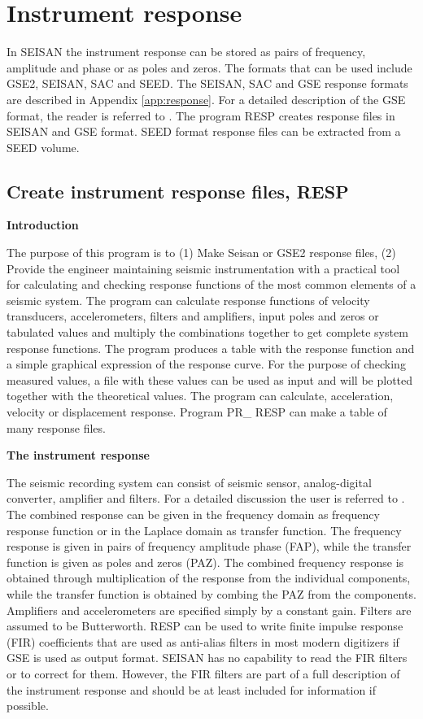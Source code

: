 
\section{Instrument response} 
\label{sect:inst-resp}

In SEISAN the instrument response can be stored as pairs of frequency, 
amplitude and phase or as poles and zeros. The formats that can be 
used include GSE2, SEISAN, SAC and SEED. The SEISAN, SAC and GSE response formats 
are described in Appendix \ref{app:response}. For a detailed description of the GSE 
format, the reader is referred to \citet{gsett1997}. The program RESP 
creates response files in SEISAN and GSE format. SEED format response 
files can be extracted from a SEED volume.  

\subsection{Create instrument response files, RESP} 

\textbf{Introduction}

The purpose of this program is to (1) Make Seisan or GSE2 response files, (2) Provide the engineer maintaining seismic instrumentation with a practical tool for calculating and checking response functions of the most common elements of a seismic system. The program can calculate response functions of velocity transducers, accelerometers, filters and amplifiers, input poles and zeros or tabulated values and multiply the combinations together to get complete system response functions. The program produces a table with the response function and a simple graphical expression of the response curve. For the purpose of checking measured values, a file with these values can be used as input and will be plotted together with the theoretical values. The program can calculate, acceleration, velocity or displacement response. Program PR\_ RESP  can make a table of many response files. 

\textbf{The instrument response}

The seismic recording system can consist of seismic sensor, analog-digital converter, amplifier and filters. For a detailed discussion the user is referred to \citet{scherbaum1996}. The combined response can be given in the frequency domain as frequency response function or in the Laplace domain as transfer function. The frequency response is given in pairs of frequency amplitude phase (FAP), while the transfer function is given as poles and zeros (PAZ). The combined frequency response is obtained through multiplication of the response from the individual components, while the transfer function is obtained by combing the PAZ from the components. Amplifiers and accelerometers are specified simply by a constant gain. Filters are assumed to be Butterworth. RESP can be used to write finite impulse response (FIR) coefficients \citep{scherbaum1996} that are used as anti-alias filters in most modern digitizers if GSE is used as output format. SEISAN has no capability to read the FIR filters or to correct for them. However, the FIR filters are part of a full description of the instrument response and should be at least included for information if possible. 

